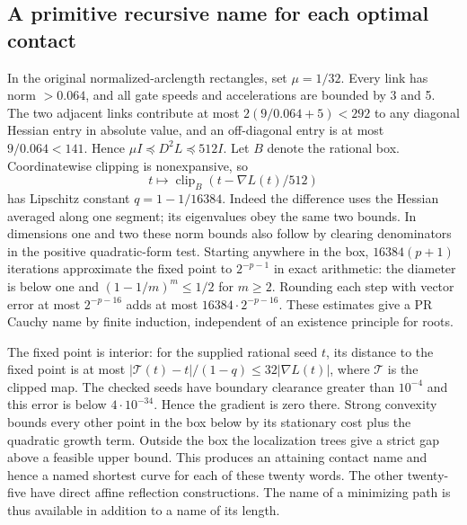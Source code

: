 \documentclass[10pt,letterpaper]{article}
\begin{document}
\subsection*{A primitive recursive name for each optimal contact}
In the original normalized-arclength rectangles, set $\mu=1/32$. Every link has norm $>0.064$, and all gate speeds and accelerations are bounded by 3 and 5. The two adjacent links contribute at most $2(9/0.064+5)<292$ to any diagonal Hessian entry in absolute value, and an off-diagonal entry is at most $9/0.064<141$. Hence $\mu I\preceq D^2 L\preceq512 I$. Let $B$ denote the rational box. Coordinatewise clipping is nonexpansive, so
\[
   t\longmapsto \operatorname{clip}_{B}(t-\nabla L(t)/512)
\]
has Lipschitz constant $q=1-1/16384$. Indeed the difference uses the Hessian averaged along one segment; its eigenvalues obey the same two bounds. In dimensions one and two these norm bounds also follow by clearing denominators in the positive quadratic-form test. Starting anywhere in the box, $16384(p+1)$ iterations approximate the fixed point to $2^{-p-1}$ in exact arithmetic: the diameter is below one and $(1-1/m)^m\le1/2$ for $m\ge2$. Rounding each step with vector error at most $2^{-p-16}$ adds at most $16384\cdot2^{-p-16}$. These estimates give a PR Cauchy name by finite induction, independent of an existence principle for roots.
\par The fixed point is interior: for the supplied rational seed $t$, its distance to the fixed point is at most $|\mathcal T(t)-t|/(1-q)\le32|\nabla L(t)|$, where $\mathcal T$ is the clipped map. The checked seeds have boundary clearance greater than $10^{-4}$ and this error is below $4\cdot10^{-34}$. Hence the gradient is zero there. Strong convexity bounds every other point in the box below by its stationary cost plus the quadratic growth term. Outside the box the localization trees give a strict gap above a feasible upper bound. This produces an attaining contact name and hence a named shortest curve for each of these twenty words. The other twenty-five have direct affine reflection constructions. The name of a minimizing path is thus available in addition to a name of its length.

\end{document}
